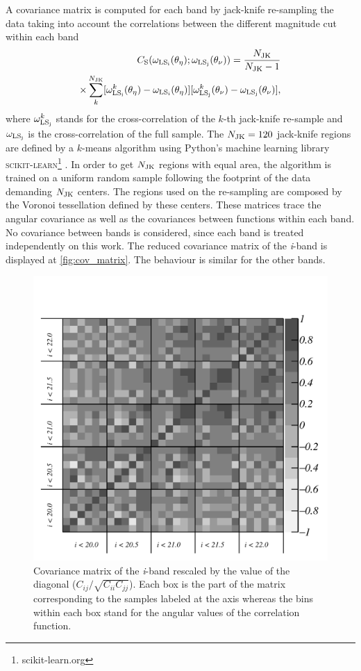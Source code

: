 A covariance matrix is computed for each band by jack-knife re-sampling the data taking into account the correlations between the different magnitude cut within each band
\begin{eqnarray}
C_{\rm S}(\omega_{\rm LS_i}(\theta_\eta);\omega_{\rm LS_j}(\theta_\nu)) = \frac{N_{\rm JK}}{N_{\rm JK}-1}\\
\times \sum\limits_k^{N_{\rm JK}}[\omega_{\rm LS_i}^k(\theta_\eta)-\omega_{\rm LS_i}(\theta_\eta)][\omega_{\rm LS_j}^k(\theta_\nu)-\omega_{\rm LS_j}(\theta_\nu)]\nonumber,
\end{eqnarray}
where $\omega^k_{\rm LS_j}$ stands for the cross-correlation of the $k$-th jack-knife re-sample and $\omega_{\rm LS_j}$ is the cross-correlation of the full sample. The $N_{\rm JK}= 120$ jack-knife regions are defined by a $k$-means algorithm \cite{macqueen1967some} using Python's machine learning library {\scshape scikit-learn}\footnote{scikit-learn.org} \cite{scikit-learn}. In order to get $N_{\rm JK}$ regions with equal area, the algorithm is trained on a uniform random sample following the footprint of the data demanding $N_{\rm JK}$ centers. The regions used on the re-sampling are composed by the Voronoi tessellation defined by these centers. These matrices trace the angular covariance as well as the covariances between functions within each band. No covariance between bands is considered, since each band is treated independently on this work. The reduced covariance matrix of the {\itshape i}-band is displayed at \autoref{fig:cov_matrix}. The behaviour is similar for the other bands.
\begin{figure}
\includegraphics[width=\textwidth,trim={0 0 0 2cm},clip]{./figures/cov_matrix_mag_auto_i.pdf}
\caption{Covariance matrix of the {\it i}-band rescaled by the value of the diagonal ($C_{ij}/\sqrt{C_{ii}C_{jj}}$). Each box is the part of the matrix corresponding to the samples labeled at the axis whereas the bins within each box stand for the angular values of the correlation function.}
\label{fig:cov_matrix}
\end{figure}
\newline

